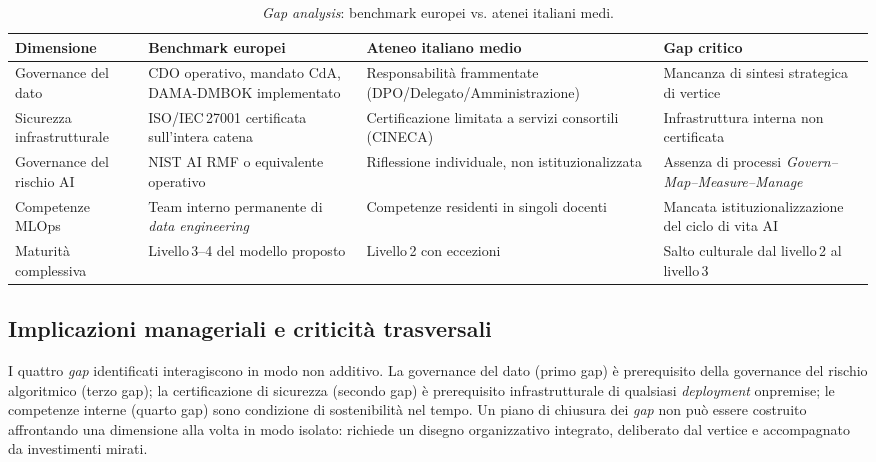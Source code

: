 \begin{table}[H]
\centering
\caption{\textit{Gap analysis}: benchmark europei vs. atenei italiani medi.}
\label{tab:gap-analysis}
\begin{tabularx}{\textwidth}{l X X X}
\toprule
\textbf{Dimensione} & \textbf{Benchmark europei} & \textbf{Ateneo italiano medio} &
\textbf{Gap critico} \\
\midrule
Governance del dato & CDO operativo, mandato CdA, DAMA-DMBOK implementato &
Responsabilità frammentate (DPO/Delegato/Amministrazione) & Mancanza di sintesi
strategica di vertice \\
Sicurezza infrastrutturale & ISO/IEC\,27001 certificata sull'intera catena &
Certificazione limitata a servizi consortili (CINECA) & Infrastruttura interna non
certificata \\
Governance del rischio AI & NIST AI RMF o equivalente operativo & Riflessione individuale,
non istituzionalizzata & Assenza di processi \textit{Govern--Map--Measure--Manage} \\
Competenze MLOps & Team interno permanente di \textit{data engineering} &
Competenze residenti in singoli docenti & Mancata istituzionalizzazione del ciclo di vita
AI \\
Maturità complessiva & Livello\,3--4 del modello proposto & Livello\,2 con eccezioni &
Salto culturale dal livello\,2 al livello\,3 \\
\bottomrule
\end{tabularx}
\end{table}

\subsection{Implicazioni manageriali e criticità trasversali}

I quattro \textit{gap} identificati interagiscono in modo non additivo. La governance del
dato (primo gap) è prerequisito della governance del rischio algoritmico (terzo gap); la
certificazione di sicurezza (secondo gap) è prerequisito infrastrutturale di qualsiasi
\textit{deployment} \gls{onpremise}; le competenze interne (quarto gap) sono
condizione di sostenibilità nel tempo. Un piano di chiusura dei \textit{gap} non può
essere costruito affrontando una dimensione alla volta in modo isolato: richiede un
disegno organizzativo integrato, deliberato dal vertice e accompagnato da investimenti
mirati.

